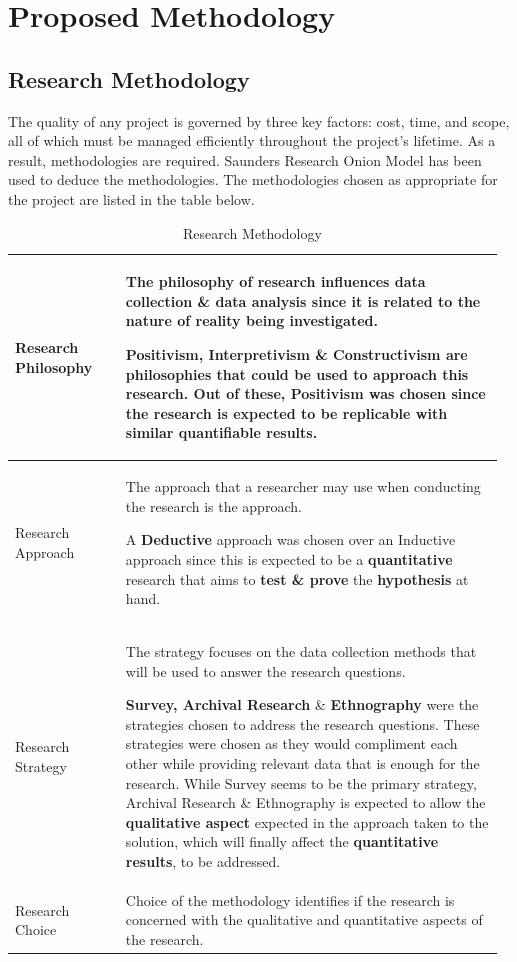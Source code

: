 \documentclass[a4paper, 12pt, oneside]{report}
\begin{document}
\chapter{Proposed Methodology}

\section{Research Methodology}
The quality of any project is governed by three key factors: cost, time, and scope, all of which must be managed efficiently throughout the project's lifetime. As a result, methodologies are required. Saunders  Research Onion Model \autocite{writers_saunders_2019} has been used to deduce the methodologies. 
The methodologies chosen as appropriate for the project are listed in the table below.

\begin{longtable}{| p{0.22\linewidth} | p{0.75\linewidth}|}
\caption{Research Methodology}
\label{tab:research-methodology-table}\\
\hline
Research Philosophy  & The philosophy of research influences data collection \& data analysis since it is related to the nature of reality being investigated.

Positivism, Interpretivism \& Constructivism are philosophies that could be used to approach this research. Out of these, \textbf{Positivism} was chosen since the research is expected to be replicable with similar \textbf{quantifiable} results.
\\
\hline
Research Approach & The approach that a researcher may use when conducting the research is the approach.

A \textbf{Deductive} approach was chosen over an Inductive approach since this is expected to be a \textbf{quantitative} research that aims to \textbf{test \& prove} the \textbf{hypothesis} at hand. \\
\hline
Research Strategy  &The strategy focuses on the data collection methods that will be used to answer the research questions.

\textbf{Survey, Archival Research} \& \textbf{Ethnography} were the strategies chosen to address the research questions. These strategies were chosen as they would compliment each other while providing relevant data that is enough for the research. While Survey seems to be the primary strategy, Archival Research \& Ethnography is expected to allow the \textbf{qualitative aspect} expected in the approach taken to the solution, which will finally affect the \textbf{quantitative results}, to be addressed. \\
\hline
Research Choice & Choice of the methodology identifies if the research is concerned with the qualitative and quantitative aspects of the research.



\end{longtable}
\end{document}
